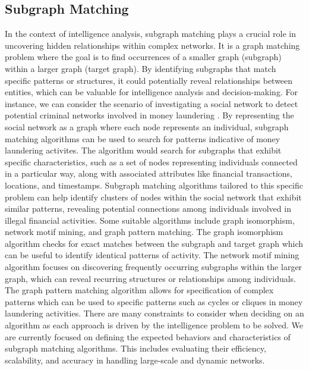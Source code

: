 \documentclass[letterpaper, 10pt]{article}
\begin{document}
\begin{multicols}{2}
{        \subsection{Subgraph Matching}\label{section:subgraphMatching}
            In the context of intelligence analysis, subgraph matching plays a crucial role in uncovering hidden relationships within complex networks. 
            It is a graph matching problem where the goal is to find occurrences of a smaller graph (subgraph) within a larger graph (target graph). 
            By identifying subgraphs that match specific patterns or structures, it could potentially reveal relationships between entities, which can be valuable for intelligence analysis and decision-making. 
            For instance, we can consider the scenario of investigating a social network to detect potential criminal networks involved in money laundering \cite{Soltani2016}. 
            By representing the social network as a graph where each node represents an individual, subgraph matching algorithms can be used to search for patterns indicative of money laundering activites. 
            The algorithm would search for subgraphs that exhibit specific characteristics, such as a set of nodes representing individuals connected in a particular way, along with associated attributes like financial transactions, locations, and timestamps. 
            Subgraph matching algorithms tailored to this specific problem can help identify clusters of nodes within the social network that exhibit similar patterns, revealing potential connections among individuals involved in illegal financial activities. 
            Some suitable algorithms include graph isomorphism, network motif mining, and graph pattern matching. 
            The graph isomorphism algorithm \cite{Babai2016} checks for exact matches between the subgraph and target graph which can be useful to identify identical patterns of activity. 
            The network motif mining algorithm \cite{Oliver2022}focuses on discovering frequently occurring subgraphs within the larger graph, which can reveal recurring structures or relationships among individuals. 
            The graph pattern matching algorithm \cite{Cheng2008} allows for specification of complex patterns which can be used to specific patterns such as cycles or cliques in money laundering activities. 
            There are many constraints to consider when deciding on an algorithm as each approach is driven by the intelligence problem to be solved. 
            We are currently focused on defining the expected behaviors and characteristics of subgraph matching algorithms. 
            This includes evaluating their efficiency, scalability, and accuracy in handling large-scale and dynamic networks. 

}
\end{multicols}
\end{document}

